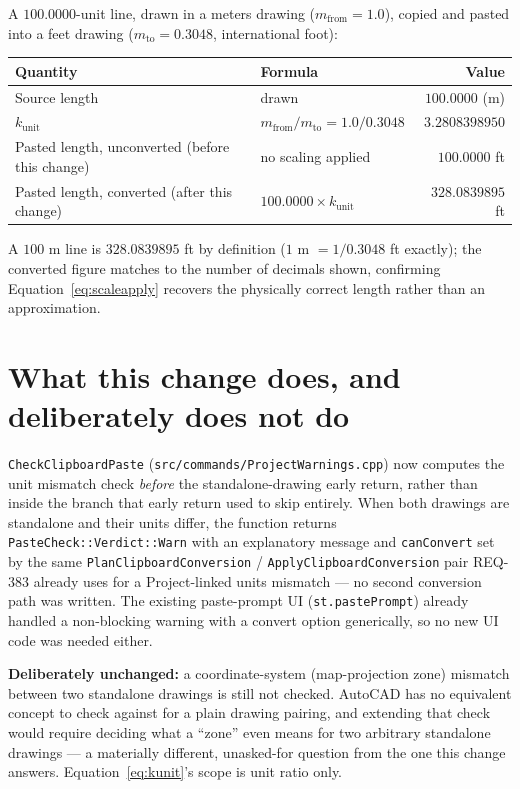 \documentclass[11pt]{article}
\begin{document}
A $100.0000$-unit line, drawn in a meters drawing ($m_{\mathrm{from}} =
1.0$), copied and pasted into a feet drawing ($m_{\mathrm{to}} = 0.3048$,
international foot):
\begin{center}
\begin{tabular}{@{}llr@{}}
\toprule
Quantity & Formula & Value \\
\midrule
Source length & drawn & $100.0000$ (m) \\
$k_{\mathrm{unit}}$ & $m_{\mathrm{from}} / m_{\mathrm{to}} = 1.0 / 0.3048$ & $3.2808398950$ \\
Pasted length, unconverted (before this change) & no scaling applied & $100.0000$ ft \\
Pasted length, converted (after this change) & $100.0000 \times k_{\mathrm{unit}}$ & $328.0839895$ ft \\
\bottomrule
\end{tabular}
\end{center}
A $100$ m line is $328.0839895$ ft by definition ($1$ m $= 1/0.3048$ ft
exactly); the converted figure matches to the number of decimals shown,
confirming Equation~\ref{eq:scaleapply} recovers the physically correct
length rather than an approximation.

\section{What this change does, and deliberately does not do}
\label{sec:implementation}

\texttt{CheckClipboardPaste} (\texttt{src/commands/ProjectWarnings.cpp}) now
computes the unit mismatch check \emph{before} the standalone-drawing early
return, rather than inside the branch that early return used to skip
entirely. When both drawings are standalone and their units differ, the
function returns \texttt{PasteCheck::Verdict::Warn} with an explanatory
message and \texttt{canConvert} set by the same
\texttt{PlanClipboardConversion} / \texttt{ApplyClipboardConversion} pair
REQ-383 already uses for a Project-linked units mismatch --- no second
conversion path was written. The existing paste-prompt UI
(\texttt{st.pastePrompt}) already handled a non-blocking warning with a
convert option generically, so no new UI code was needed either.

\textbf{Deliberately unchanged:} a coordinate-system (map-projection zone)
mismatch between two standalone drawings is still not checked. AutoCAD has
no equivalent concept to check against for a plain drawing pairing, and
extending that check would require deciding what a ``zone'' even means for
two arbitrary standalone drawings --- a materially different, unasked-for
question from the one this change answers. Equation~\ref{eq:kunit}'s
scope is unit ratio only.
\end{document}
